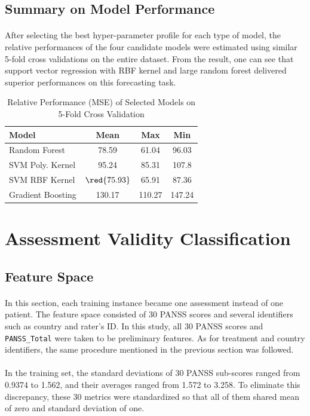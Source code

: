 \documentclass[11pt]{article}
\begin{document}
	\subsection{Summary on Model Performance}
	\paragraph{} After selecting the best hyper-parameter profile for each type of model, the relative performances of the four candidate models were estimated using similar 5-fold cross validations on the entire dataset. From the result, one can see that support vector regression with RBF kernel and large random forest delivered superior performances on this forecasting task.
	\begin{table}[H]
		\centering
		\begin{tabular}{l|c|c|c}
			Model & Mean & Max & Min \\
			\hline
			Random Forest & 78.59 & 61.04 & 96.03 \\
			SVM Poly. Kernel & 95.24 & 85.31 & 107.8 \\
			SVM RBF Kernel & $\red{75.93}$ & 65.91 & 87.36 \\
			Gradient Boosting & 130.17 & 110.27 & 147.24
		\end{tabular}
		\caption{Relative Performance (MSE) of Selected Models on 5-Fold Cross Validation}
	\end{table}
	
	\section{Assessment Validity Classification}
	\subsection{Feature Space}
	\paragraph{} In this section, each training instance became one assessment instead of one patient. The feature space consisted of 30 PANSS scores and several identifiers such as country and rater's ID. In this study, all 30 PANSS scores and \texttt{PANSS\_Total} were taken to be preliminary features. As for treatment and country identifiers, the same procedure mentioned in the previous section was followed.
	\paragraph{} In the training set, the standard deviations of 30 PANSS sub-scores ranged from 0.9374 to 1.562, and their averages ranged from 1.572 to 3.258. To eliminate this discrepancy, these 30 metrics were standardized so that all of them shared mean of zero and standard deviation of one.
\end{document}
